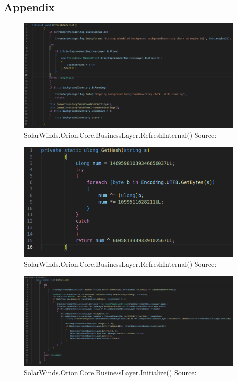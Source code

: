 \documentclass[
	letterpaper, %
	10pt, %
	unnumberedsections, %
	twoside, %
]{LTJournalArticle}
\begin{document}
\begin{appendices}
\onecolumn

\section{Appendix}


\begin{figure}[ht] %
	\includegraphics[width=\linewidth]{Figures/RefreshInternal.png}
	\caption{SolarWinds.Orion.Core.BusinessLayer.RefreshInternal() Source:\cite{SolarWindsOrionCoreBusinessLayerdll}}
	\label{fig:RefreshInternal}
\end{figure}

\begin{figure}[h] %
	\includegraphics[width=0.5\linewidth]{Figures/GetHash.png}
   \caption{SolarWinds.Orion.Core.BusinessLayer.RefreshInternal() Source:\cite{SolarWindsOrionCoreBusinessLayerdll}}
	\label{fig:GetHash}
\end{figure}


\begin{landscape}

	\begin{figure}[p] %
		\includegraphics[width=\linewidth]{Figures/Initialize.png}
		\caption{SolarWinds.Orion.Core.BusinessLayer.Initialize() Source:\cite{SolarWindsOrionCoreBusinessLayerdll}}
		\label{fig:Initialize}
	\end{figure}


\end{landscape}
\end{appendices}
\end{document}

